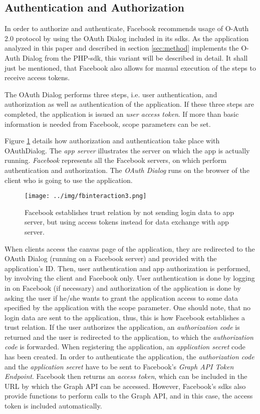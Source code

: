 \documentclass[preprint,12pt]{elsarticle}
\begin{document}
\subsection{Authentication and Authorization}
\label{sec:auth-auth}
In order to authorize and authenticate, Facebook recommends usage of
O-Auth 2.0 protocol by using the OAuth Dialog included in its
\ac{sdks}. As the application analyzed in this paper and described in section 
\ref{sec:method} implements the O-Auth Dialog from the PHP-\ac{sdk},
this variant will be described in detail. It shall just be mentioned,
that Facebook also allows for manual execution of the steps to receive
access tokens.\cite{facebookDevAuth}  

The OAuth Dialog performs three steps, i.e. user authentication, 
and authorization as well as authentication of the
application. If these three steps are completed, the application is
issued an \textit{user access token}. If more than basic information
is needed from Facebook, scope parameters can be set.\cite{facebookDevAuth}

Figure \ref{fig:authorization} details how authorization and
authentication take place with OAuthDialog. The \textit{app server}
illustrates the server on which the app is actually
running. \textit{Facebook} represents all the Facebook servers, on
which perform authentication and authorization. The \textit{OAuth
  Dialog} runs on the browser of the client who is going to use the
application.


\begin{figure}
\label{fig:authorization}
  \texttt{[image: ../img/fbinteraction3.png]}
  \caption{Facebook establishes trust relation by not sending login
    data to app server, but using access tokens instead for
    data exchange with app server.}
\end{figure}

When clients access the canvas page of the application, they are
redirected to the OAuth Dialog (running on a Facebook server) and
provided with the application's ID. Then, user authentication and
app authorization is performed, by involving the client and Facebook
only. User authentication is done by logging in on Facebook (if necessary) and
authorization of the application is done by asking the user if he/she
wants to grant the application access to some data specified by the
application with the scope parameter. One should note, that no
login data are sent to the application, thus, this is how Facebook
establishes a trust relation. 
If the user authorizes the application, an \textit{authorization code} is returned and
the user is redirected to the application, to which the
\textit{authorization code} is forwarded. When registering the
application, an \textit{application secret} code has been
created. In order to authenticate the application, the
\textit{authorization code} and the \textit{application secret} have
to be sent to Facebook's \textit{Graph API Token Endpoint}. Facebook
then returns an \textit{access token}, which can be included in the
URL by which the Graph API can be accessed. However, Facebook's
\ac{sdks} also provide functions to perform calls to the Graph API,
and in this case, the access token is included automatically.
\end{document}
